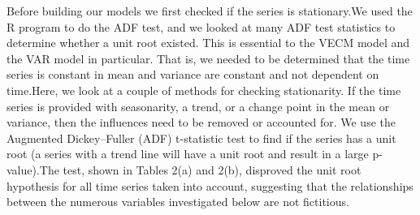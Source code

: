 Before building our models we first checked  if the series is stationary.We used the R program to do the ADF test, and we looked at many ADF test statistics to determine whether a unit root existed. This is essential to the VECM model and the VAR model in particular. That is, we needed to be determined that the time series is constant in mean and variance are constant and not dependent on time.Here, we look at a couple of methods for checking stationarity. If the time series is provided with seasonarity, a trend, or a change point in the mean or variance, then the influences need to be removed or accounted for. We use the Augmented Dickey–Fuller (ADF) t-statistic test to find if the series has a unit root (a series with a trend line will have a unit root and result in a large p-value).\parencite{dickey1979distribution}The test, shown in Tables 2(a) and 2(b), disproved the unit root hypothesis for all time series taken into account, suggesting that the relationships between the numerous variables investigated below are not fictitious.
\label{Chapter4} %
